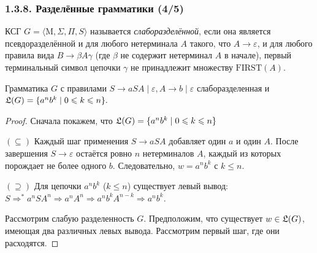 \documentclass[mathserif,12pt,aspectratio=169]{beamer}
\renewcommand{\index}[1]{}
\def\odmkey#1#2{{\it\color{red} #1}\index{#2}}
\let\le\leqslant
\begin{document}
\begin{frame}
\frametitle{1.3.8. Разделённые грамматики (4/5)}
КСГ $G=\langle \mathrm{M}, \Sigma, \Pi, S \rangle$ называется 
\odmkey{слаборазделённой}{Грамматика!слаборазделённая}, если она 
является псевдоразделённой
и для любого нетерминала $A$ такого, что $A \to \varepsilon$, 
и для любого правила вида $B \to \beta A \gamma$ (где $\beta$ не содержит 
нетерминал $A$ в начале), первый терминальный символ цепочки $\gamma$ 
не принадлежит множеству $\mathrm{FIRST}(A)$.

\smallskip

\begin{example}
Грамматика $G$ с правилами
\(
S \to aSA \mid \varepsilon,  A \to b \mid \varepsilon
\) слаборазделенная и 
\(
\frak{L}(G) = \{ a^n b^k \mid 0 \le k \le n \}.
\)
\end{example}

\begin{proof} Сначала покажем, что \( \frak{L}(G) = \{ a^n b^k \mid 0 \le k \le n \} \) 

$(\subseteq)$ Каждый шаг применения $S \to aSA$ добавляет один $a$ и один $A$. После завершения $S \to \varepsilon$ остаётся ровно $n$ нетерминалов $A$, каждый из которых порождает не более одного $b$. Следовательно, $w = a^n b^k$ с $k \le n$.

$(\supseteq)$ Для цепочки $a^n b^k$ ($k \le n$) существует левый вывод:
\(
S \Rightarrow^* a^n S A^n \Rightarrow a^n A^n \Rightarrow a^n b^k A^{n-k} \Rightarrow a^n b^k.
\)

\smallskip

Рассмотрим слабую разделенность $ G $. Предположим, что существует $  w \in \frak{L}(G)  $, имеющая два различных левых вывода. Рассмотрим первый шаг, где они расходятся. 

\end{proof}

\end{frame}
\end{document}
